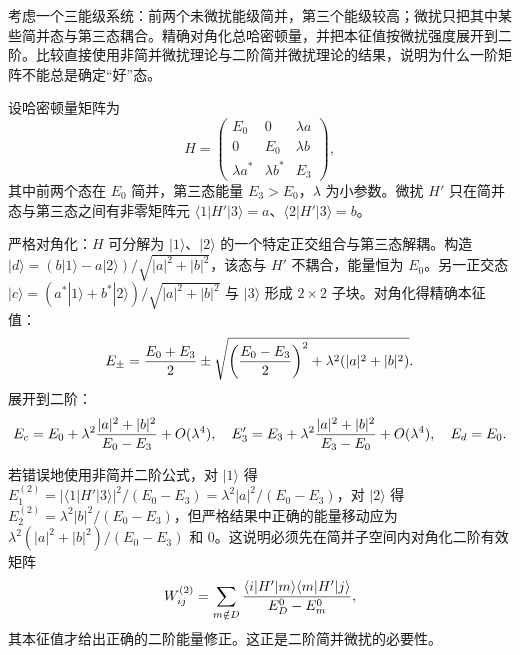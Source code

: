 \begin{question}
考虑一个三能级系统：前两个未微扰能级简并，第三个能级较高；微扰只把其中某些简并态与第三态耦合。精确对角化总哈密顿量，并把本征值按微扰强度展开到二阶。比较直接使用非简并微扰理论与二阶简并微扰理论的结果，说明为什么一阶矩阵不能总是确定“好”态。
\end{question}
\begin{solution}
设哈密顿量矩阵为
\[
H = \begin{pmatrix}
E_0 & 0 & \lambda a\\
0 & E_0 & \lambda b\\
\lambda a^* & \lambda b^* & E_3
\end{pmatrix},
\]
其中前两个态在 $E_0$ 简并，第三态能量 $E_3>E_0$，$\lambda$ 为小参数。微扰 $H'$ 只在简并态与第三态之间有非零矩阵元 $\langle 1|H'|3\rangle=a$、$\langle 2|H'|3\rangle=b$。

严格对角化：$H$ 可分解为 $|1\rangle$、$|2\rangle$ 的一个特定正交组合与第三态解耦。构造 $|d\rangle = (b|1\rangle - a|2\rangle)/\sqrt{|a|^2+|b|^2}$，该态与 $H'$ 不耦合，能量恒为 $E_0$。另一正交态 $|c\rangle = (a^*|1\rangle+b^*|2\rangle)/\sqrt{|a|^2+|b|^2}$ 与 $|3\rangle$ 形成 $2\times2$ 子块。对角化得精确本征值：
\[
E_\pm = {E_0+E_3\over2} \pm \sqrt{\left({E_0-E_3\over2}\right)^2 + \lambda^2(|a|^2+|b|^2)}.
\]
展开到二阶：
\[
E_c = E_0 + \lambda^2{|a|^2+|b|^2\over E_0-E_3} + O(\lambda^4),\quad
E_3' = E_3 + \lambda^2{|a|^2+|b|^2\over E_3-E_0} + O(\lambda^4),\quad
E_d = E_0.
\]

若错误地使用非简并二阶公式，对 $|1\rangle$ 得 $E_1^{(2)}=|\langle 1|H'|3\rangle|^2/(E_0-E_3)=\lambda^2|a|^2/(E_0-E_3)$，对 $|2\rangle$ 得 $E_2^{(2)}=\lambda^2|b|^2/(E_0-E_3)$，但严格结果中正确的能量移动应为 $\lambda^2(|a|^2+|b|^2)/(E_0-E_3)$ 和 $0$。这说明必须先在简并子空间内对角化二阶有效矩阵
\[
W^{(2)}_{ij}=\sum_{m\notin D}{\langle i|H'|m\rangle\langle m|H'|j\rangle\over E_D^0-E_m^0},
\]
其本征值才给出正确的二阶能量修正。这正是二阶简并微扰的必要性。
\end{solution}

